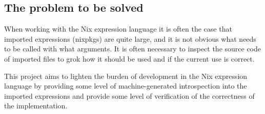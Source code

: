 \documentclass[12pt]{article}
\begin{document}
\subsection{The problem to be solved}

When working with the Nix expression language it is often the case that imported expressions (nixpkgs) are quite large, and it is not obvious what needs to be called with what arguments. It is often necessary to inspect the source code of imported files to grok how it should be used and if the current use is correct.

This project aims to lighten the burden of development in the Nix expression language by providing some level of machine-generated introspection into the imported expressions and provide some level of verification of the correctness of the implementation.
\end{document}
